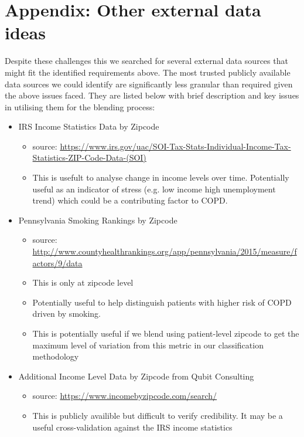 \documentclass{article}
\begin{document}
\section*{Appendix: Other external data ideas}

Despite these challenges this we searched for several external data sources that might fit the identified requirements above. The most trusted publicly available data sources we could identify are 
significantly less granular than required given the above issues faced. They are 
listed below with brief description and key issues in utilising them 
for the blending process:

\begin{itemize}
  \item  IRS Income Statistics Data by Zipcode
  \begin{itemize}
    \item source: \url{https://www.irs.gov/uac/SOI-Tax-Stats-Individual-Income-Tax-Statistics-ZIP-Code-Data-(SOI)}
    \item This is usefult to analyse change in income levels over time. 
          Potentially useful as an indicator of stress (e.g. low income high 
          unemployment trend) which could be a contributing factor to COPD.
  \end{itemize}
  \item Pennsylvania Smoking Rankings by Zipcode
  \begin{itemize}
    \item source: \url{http://www.countyhealthrankings.org/app/pennsylvania/2015/measure/factors/9/data}
    \item This is only at zipcode level
    \item Potentially useful to help distinguish patients with higher risk of
          COPD driven by smoking.
    \item This is potentially useful if we blend using patient-level zipcode 
          to get the maximum level of variation from this metric in 
          our classification methodology
  \end{itemize}
  \item Additional Income Level Data by Zipcode from Qubit Consulting
  \begin{itemize}
    \item source: \url{https://www.incomebyzipcode.com/search/}
    \item This is publicly availible but difficult to verify credibility. It may 
          be a useful cross-validation against the IRS income statistics 

\end{itemize}
\end{itemize}
\end{document}
